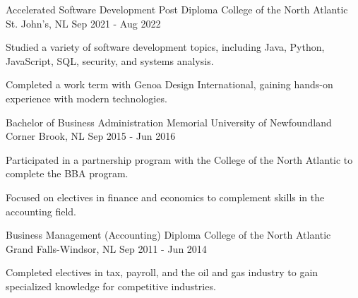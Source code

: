 
\begin{cventries}
	
	\cventry
	{Accelerated Software Development Post Diploma} %
	{College of the North Atlantic} %
	{St. John's, NL} %
	{Sep 2021 - Aug 2022} %
	{
		\begin{cvitems} %
			\item {Studied a variety of software development topics, including Java, Python, JavaScript, SQL, security, and systems analysis.}
			\item {Completed a work term with Genoa Design International, gaining hands-on experience with modern technologies.}
		\end{cvitems}
	}
	
	\cventry
	{Bachelor of Business Administration} %
	{Memorial University of Newfoundland} %
	{Corner Brook, NL} %
	{Sep 2015 - Jun 2016} %
	{
		\begin{cvitems} %
			\item {Participated in a partnership program with the College of the North Atlantic to complete the BBA program.}
			\item {Focused on electives in finance and economics to complement skills in the accounting field.}
		\end{cvitems}
	}
	
	\cventry
	{Business Management (Accounting) Diploma} %
	{College of the North Atlantic} %
	{Grand Falls-Windsor, NL} %
	{Sep 2011 - Jun 2014} %
	{
		\begin{cvitems} %
			\item {Completed electives in tax, payroll, and the oil and gas industry to gain specialized knowledge for competitive industries.}
		\end{cvitems}
	}
	
\end{cventries}
